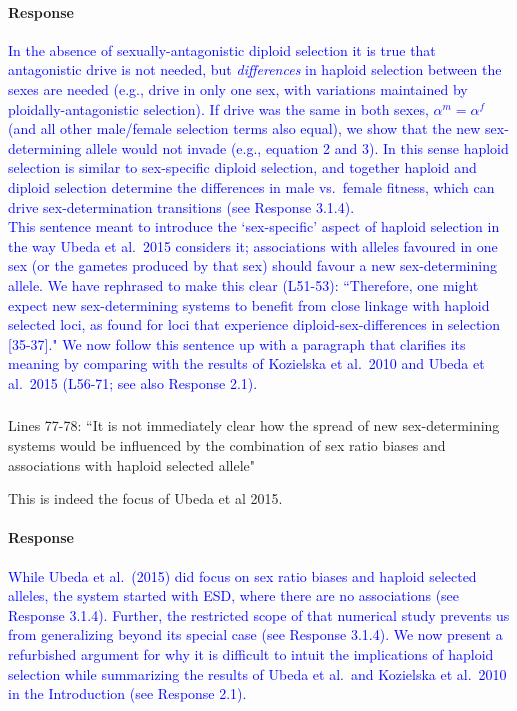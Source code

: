 \documentclass[10pt,letterpaper]{article}
\begin{document}
\noindent\paragraph{Response}
\textcolor{blue}{In the absence of sexually-antagonistic diploid selection it is true that antagonistic drive is not needed, but \textit{differences} in haploid selection between the sexes are needed (e.g., drive in only one sex, with variations maintained by ploidally-antagonistic selection). 
If drive was the same in both sexes, $\alpha^{m}=\alpha^{f}$ (and all other male/female selection terms also equal), we show that the new sex-determining allele would not invade (e.g., equation 2 and 3). 
In this sense haploid selection is similar to sex-specific diploid selection, and together haploid and diploid selection determine the differences in male vs.\ female fitness, which can drive sex-determination transitions (see Response 3.1.4).\\
This sentence meant to introduce the `sex-specific' aspect of haploid selection in the way Ubeda et al.\ 2015 considers it; associations with alleles favoured in one sex (or the gametes produced by that sex) should favour a new sex-determining allele.
We have rephrased to make this clear (L51-53): ``Therefore, one might expect new sex-determining systems to benefit from close linkage with haploid selected loci, as found for loci that experience diploid-sex-differences in selection [35-37]."
We now follow this sentence up with a paragraph that clarifies its meaning by comparing with the results of Kozielska et al.\ 2010 and Ubeda et al.\ 2015 (L56-71; see also Response 2.1).}

\noindent\subsubsection{}
Lines 77-78: ``It is not immediately clear how the spread of new sex-determining systems would be influenced by the combination of sex ratio biases and associations with haploid selected allele"

This is indeed the focus of Ubeda et al 2015.

\noindent\paragraph{Response}
\textcolor{blue}{While Ubeda et al.\ (2015) did focus on sex ratio biases and haploid selected alleles, the system started with ESD, where there are no associations (see Response 3.1.4).
Further, the restricted scope of that numerical study prevents us from generalizing beyond its special case (see Response 3.1.4).
We now present a refurbished argument for why it is difficult to intuit the implications of haploid selection while summarizing the results of Ubeda et al.\ and Kozielska et al.\ 2010 in the Introduction (see Response 2.1).
}
\end{document}
